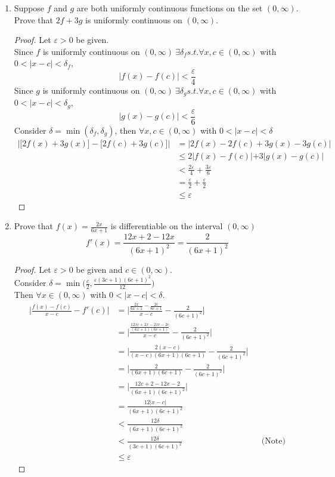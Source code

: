 \documentclass[12pt]{article}
\begin{document}
\begin{enumerate}
    \item Suppose $f$ and $g$ are both uniformly continuous functions on the set $(0, \infty)$. Prove 
    that $2f + 3g$ is uniformly continuous on $(0, \infty)$.
    \begin{proof}
        Let $\varepsilon > 0$ be given. \\
        Since $f$ is uniformly continuous on $(0, \infty) \ \exists \delta_f s.t. \forall x,c \in (0, \infty)$ with $0 < |x-c| < \delta_f$, 
        \[\big| f(x) - f(c) \big| < \frac{\varepsilon}{4}\]
        Since $g$ is uniformly continuous on $(0, \infty) \ \exists \delta_g s.t. \forall x,c \in (0, \infty)$ with $0 < |x-c| < \delta_g$, 
        \[\big| g(x) - g(c) \big| < \frac{\varepsilon}{6}\]
        Consider $\delta = \min(\delta_f, \delta_g)$, then $\forall x,c \in (0, \infty)$ with $0 < |x-c| < \delta$
        \begin{align*}
            \Big| \big[ 2f(x) + 3g(x) \big] - \big[ 2f(c) + 3g(c) \big] \Big| &= \big|2f(x) - 2f(c) + 3g(x) - 3g(c) \big| \\
            &\leq 2 \big| f(x) - f(c)| + 3|g(x) - g(c) \big| \\
            &< \frac{2\varepsilon}{4} + \frac{3\varepsilon}{6} \\
            &= \frac{\varepsilon}{2} + \frac{\varepsilon}{2} \\
            &\leq \varepsilon
        \end{align*}
    \end{proof}

    \item Prove that $f(x) = \frac{2x}{6x+1}$ is differentiable on the interval $(0, \infty)$ 
    \[f'(x) = \frac{12x+2-12x}{{(6x+1)}^2} = \frac{2}{{(6x+1)}^2}\]
    \begin{proof}
        Let $\varepsilon > 0$ be given and $c \in (0, \infty)$. \\
        Consider $\delta = \min \Big( \frac{c}{2}, \frac{\varepsilon(3c+1){(6c+1)}^2}{12} \Big)$ \\
        Then $\forall x \in (0, \infty)$ with $0 < |x-c| < \delta$.
        \begin{align*}
            \bigg| \frac{f(x) - f(c)}{x-c} - f'(c) \bigg| &= \Bigg| \frac{\frac{2x}{6x+1} - \frac{2c}{6c+1}}{x-c} - \frac{2}{{(6c+1)}^2} \Bigg| \\
            &= \Bigg| \frac{\frac{12xc+2x-2xc-2c}{(6x+1)(6c+1)}}{x-c} - \frac{2}{{(6c+1)}^2} \Bigg| \\
            &= \bigg| \frac{2(x-c)}{(x-c)(6x+1)(6c+1)} - \frac{2}{{(6c+1)}^2} \bigg| \\
            &= \bigg| \frac{2}{(6x+1)(6c+1)} - \frac{2}{{(6c+1)}^2} \bigg| \\
            &= \bigg| \frac{12c+2 - 12x - 2}{(6x+1){(6c+1)}^2} \bigg| \\
            &= \frac{12|x-c|}{(6x+1){(6c+1)}^2} \\
            &< \frac{12\delta}{(6x+1){(6c+1)}^2} \\
            &< \frac{12\delta}{(3c+1){(6c+1)}^2} && \text{(Note)}\\
            &\leq \varepsilon
        \end{align*}


\end{proof}
\end{enumerate}
\end{document}
